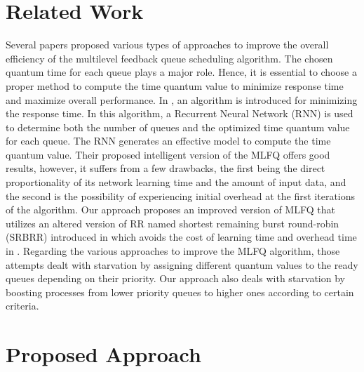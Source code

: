 \documentclass[conference]{IEEEtran}
\begin{document}

\section{Related Work}

Several papers proposed various types of approaches to improve the overall efficiency of the multilevel feedback queue scheduling algorithm. The chosen quantum time for each queue plays a major role. Hence, it is essential to choose a proper method to compute the time quantum value to minimize response time and maximize overall performance. In \cite{b2}, an algorithm is introduced for minimizing the response time. In this algorithm, a Recurrent Neural Network (RNN) is used to determine both the number of queues and the optimized time quantum value for each queue. The RNN generates an effective model to compute the time quantum value. Their proposed intelligent version of the MLFQ offers good results, however, it suffers from a few drawbacks, the first being the direct proportionality of its network learning time and the amount of input data, and the second is the possibility of experiencing initial overhead at the first iterations of the algorithm. Our approach proposes an improved version of MLFQ that utilizes an altered version of RR named shortest remaining burst round-robin (SRBRR) introduced in \cite{b3} which avoids the cost of learning time and overhead time in \cite{b2}. Regarding the various approaches to improve the MLFQ algorithm, those attempts dealt with starvation by assigning different quantum values to the ready queues depending on their priority. Our approach also deals with starvation by boosting processes from lower priority queues to higher ones according to certain criteria.


\section{Proposed Approach}
\end{document}
